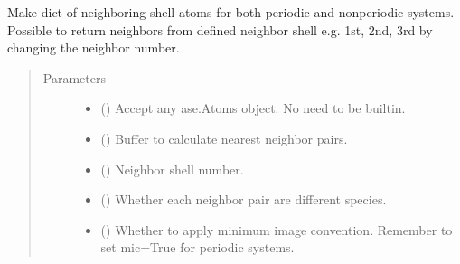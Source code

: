 \documentclass[letterpaper,10pt,english]{sphinxmanual}
\begin{document}
\begin{fulllineitems}
\label{\detokenize{utilities:acat.utilities.neighbor_shell_list}}
Make dict of neighboring shell atoms for both periodic and
non\sphinxhyphen{}periodic systems. Possible to return neighbors from defined
neighbor shell e.g. 1st, 2nd, 3rd by changing the neighbor number.
\begin{quote}\begin{description}
\item[{Parameters}] \leavevmode\begin{itemize}
\item {} 
 () \textendash{} Accept any ase.Atoms object. No need to be built\sphinxhyphen{}in.

\item {} 
 (\sphinxstyleliteralemphasis{\sphinxupquote{, }}) \textendash{} Buffer to calculate nearest neighbor pairs.

\item {} 
 (\sphinxstyleliteralemphasis{\sphinxupquote{, }}) \textendash{} Neighbor shell number.

\item {} 
 (\sphinxstyleliteralemphasis{\sphinxupquote{, }}) \textendash{} Whether each neighbor pair are different species.

\item {} 
 (\sphinxstyleliteralemphasis{\sphinxupquote{, }}) \textendash{} Whether to apply minimum image convention. Remember to set
mic=True for periodic systems.


\end{itemize}
\end{description}
\end{quote}
\end{fulllineitems}
\end{document}
